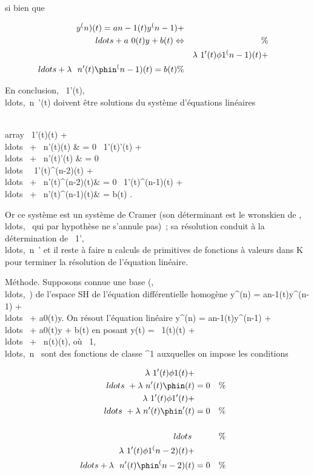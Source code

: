 si bien que

\begin{align*} y^(n)(t) = a
n-1(t)y^(n-1) +
\\ldots + a~
0(t)y + b(t) \Leftrightarrow&& \%&
\\ & &
\lambda~1'(t)\phi1^(n-1)(t) +
\\ldots + \lambda~~
n'(t)\phin^(n-1)(t) = b(t)\%&
\\ \end{align*}

En conclusion,
\lambda~1'(t),\\ldots,\lambda~n~'(t)
doivent être solutions du système d'équations linéaires

\left \\array
\lambda~1'(t)(t) +
\\ldots~ +
\lambda~n'(t)\phin(t) & = 0 \cr
\lambda~1'(t)'(t) +
\\ldots~ +
\lambda~n'(t)\phin'(t) & = 0\cr
\\ldots~
\cr \lambda~1'(t)^(n-2)(t) +
\\ldots~ +
\lambda~n'(t)\phin^(n-2)(t)& = 0 \cr
\lambda~1'(t)^(n-1)(t) +
\\ldots~ +
\lambda~n'(t)\phin^(n-1)(t)& = b(t) 
\right .

Or ce système est un système de Cramer (son déterminant est le wronskien
de
,\\ldots,\phin~
qui par hypothèse ne s'annule pas)~; sa résolution conduit à la
détermination de
\lambda~1',\\ldots,\lambda~n~'
et il reste à faire n calculs de primitives de fonctions à valeurs dans
K pour terminer la résolution de l'équation linéaire.

Méthode. Supposons connue une base
(,\\ldots,\phin~)
de l'espace SH de l'équation différentielle homogène
y^(n) = an-1(t)y^(n-1) +
\\ldots~ +
a0(t)y. On résout l'équation linéaire y^(n) =
an-1(t)y^(n-1) +
\\ldots~ +
a0(t)y + b(t) en posant y(t) = \lambda~1(t)(t)
+ \\ldots~ +
\lambda~n(t)\phin(t), où
\lambda~1,\\ldots,\lambda~n~
sont des fonctions de classe ^1 auxquelles on impose les
conditions

\begin{align*} \lambda~1'(t)\phi1(t) +
\\ldots~ +
\lambda~n'(t)\phin(t)& = 0& \%&
\\ \lambda~1'(t)\phi1'(t) +
\\ldots~ +
\lambda~n'(t)\phin'(t)& = 0& \%&
\\
\\ldots~& & \%&
\\
\lambda~1'(t)\phi1^(n-2)(t) +
\\ldots + \lambda~~
n'(t)\phin^(n-2)(t)& = 0& \%&
\\ \end{align*}


